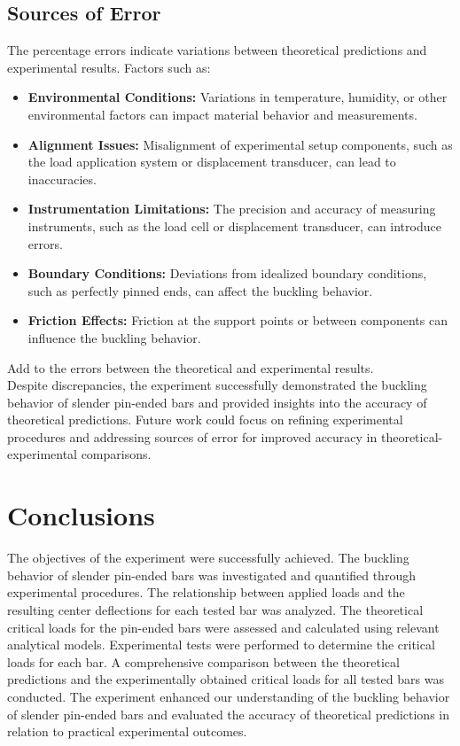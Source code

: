 \documentclass[12pt, titlepage]{article}
\begin{document}
\subsection{Sources of Error}
The percentage errors indicate variations between theoretical predictions and
experimental results. Factors such as:
\begin{itemize}
    \item \textbf{Environmental Conditions:} Variations in temperature, humidity, or other environmental factors can impact material behavior and measurements.

    \item \textbf{Alignment Issues:} Misalignment of experimental setup components, such as the load application system or displacement transducer, can lead to inaccuracies.

    \item \textbf{Instrumentation Limitations:} The precision and accuracy of measuring instruments, such as the load cell or displacement transducer, can introduce errors.

    \item \textbf{Boundary Conditions:} Deviations from idealized boundary conditions, such as perfectly pinned ends, can affect the buckling behavior.

    \item \textbf{Friction Effects:} Friction at the support points or between components can influence the buckling behavior.
\end{itemize}
Add to the errors between the theoretical and experimental results.\\[10pt]
Despite discrepancies, the experiment successfully demonstrated the buckling behavior
of slender pin-ended bars and provided insights into the accuracy of
theoretical predictions. Future work could focus on refining experimental
procedures and addressing sources of error for improved accuracy in
theoretical-experimental comparisons.
\newpage
\section{Conclusions}
The objectives of the experiment were successfully achieved. The buckling
behavior of slender pin-ended bars was investigated and quantified through
experimental procedures. The relationship between applied loads and the
resulting center deflections for each tested bar was analyzed. The theoretical
critical loads for the pin-ended bars were assessed and calculated using
relevant analytical models. Experimental tests were performed to determine
the critical loads for each bar. A comprehensive comparison between the
theoretical predictions and the experimentally obtained critical loads for
all tested bars was conducted. The experiment enhanced our understanding of
the buckling behavior of slender pin-ended bars and evaluated the accuracy
of theoretical predictions in relation to practical experimental outcomes.
\end{document}
